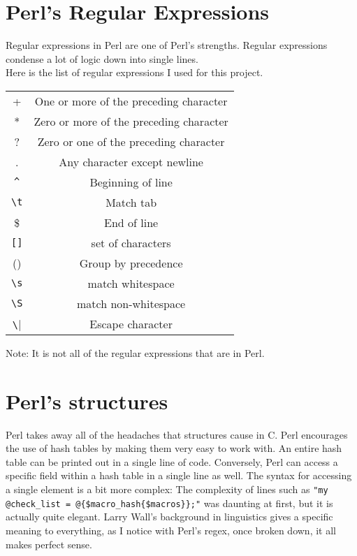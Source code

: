 \documentclass[a4paper, 12pt]{article}
\begin{document}
\section{Perl's Regular Expressions}

Regular expressions in Perl are one of Perl's strengths. Regular expressions condense a lot of logic down into single lines.\\
Here is the list of regular expressions I used for this project.\\

\begin{table}
    \begin{tabular}{|c|c|}
        \hline
        + & One or more of the preceding character \\
        * & Zero or more of the preceding character \\
        ? & Zero or one of the preceding character \\
        . & Any character except newline\\
        \verb|^| & Beginning of line \\ 
        \verb|\t| & Match tab\\
        \$ & End of line \\ 
        \verb|[]| & set of characters\\
        () & Group by precedence\\
        \verb|\s| & match whitespace\\
        \verb|\S| & match non-whitespace\\
        \verb|\| & Escape character\\
        \hline
    \end{tabular}
\end{table}
Note: It is not all of the regular expressions that are in Perl.\\

\section{Perl's structures}
Perl takes away all of the headaches that structures cause in C. Perl encourages the use of hash tables by making them very easy to work with. An entire hash table can be printed out in a single line of code. Conversely, Perl can access a specific field within a hash table in a single line as well. The syntax for accessing a single element is a bit more complex: The complexity of lines such as \verb|"my @check_list = @{$macro_hash{$macros}};"| was daunting at first, but it is actually quite elegant. Larry Wall's background in linguistics gives a specific meaning to everything, as I notice with Perl's regex, once broken down, it all makes perfect sense.\\
\end{document}
